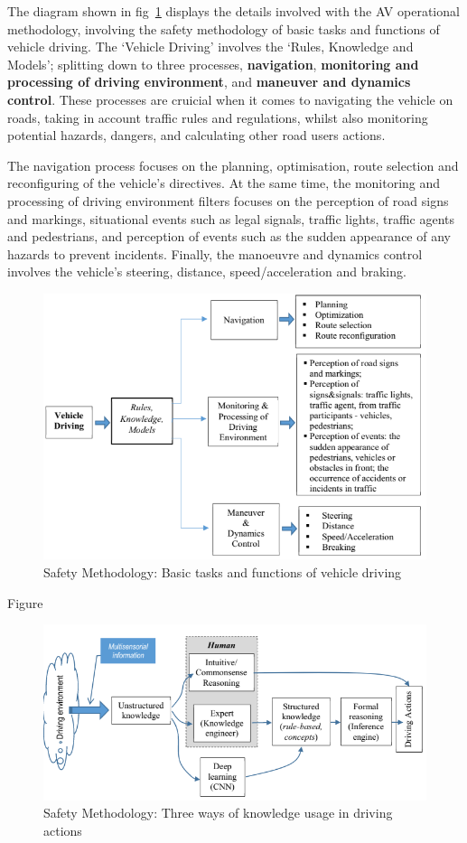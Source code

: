 \documentclass[12pt]{report} %
\begin{document}
		The diagram shown in fig~\ref{fig:avmOperationalMethodology-SF1} displays the details involved with the AV operational methodology, involving the safety methodology of basic tasks and functions of vehicle driving. The `Vehicle Driving' involves the `Rules, Knowledge and Models'; splitting down to three processes, \textbf{navigation}, \textbf{monitoring and processing of driving environment}, and \textbf{maneuver and dynamics control}. These processes are cruicial when it comes to navigating the vehicle on roads, taking in account traffic rules and regulations, whilst also monitoring potential hazards, dangers, and calculating other road users actions.

		The navigation process focuses on the planning, optimisation, route selection and reconfiguring of the vehicle's directives. At the same time, the monitoring and processing of driving environment filters focuses on the perception of road signs and markings, situational events such as legal signals, traffic lights, traffic agents and pedestrians, and perception of events such as the sudden appearance of any hazards to prevent incidents. Finally, the manoeuvre and dynamics control involves the vehicle's steering, distance, speed/acceleration and braking. 
		\begin{figure}[ht]
			\centering
			\includegraphics[width=.60\columnwidth]{Figures/literature_review/proposal/SystemFunctionality-1.png}
			\caption{Safety Methodology: Basic tasks and functions of vehicle driving~\cite{ionita_autonomous_2017}}
			\label{fig:avmOperationalMethodology-SF1}
		\end{figure}

		Figure~
		\begin{figure}[hb]
			\centering
			\includegraphics[width=.60\columnwidth]{Figures/literature_review/proposal/SystemFunctionality-2.png}
			\caption{Safety Methodology: Three ways of knowledge usage in driving actions~\cite{ionita_autonomous_2017}}
			\label{fig:avmOperationalMethodology-SF2}
		\end{figure}
\end{document}
